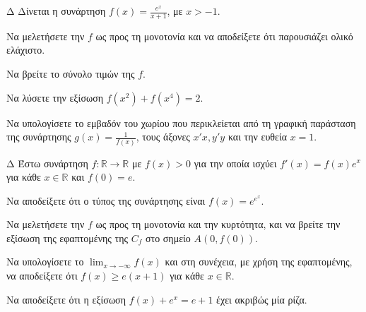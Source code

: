 \begin{thema}{Δ}
Δίνεται η συνάρτηση $\displaystyle f(x) = \frac{e^x}{x+1}$, με $x > -1$.
\begin{erwthma}
    \item Να μελετήσετε την $f$ ως προς τη μονοτονία και να αποδείξετε ότι παρουσιάζει ολικό ελάχιστο.
    \item Να βρείτε το σύνολο τιμών της $f$.
    \item Να λύσετε την εξίσωση $f(x^2) + f(x^4) = 2$.
    \item Να υπολογίσετε το εμβαδόν του χωρίου που περικλείεται από τη γραφική παράσταση της συνάρτησης $\displaystyle g(x) = \frac{1}{f(x)}$, τους άξονες $x'x, y'y$ και την ευθεία $x=1$.
\end{erwthma}
\end{thema}

\begin{thema}{Δ}
Έστω συνάρτηση $f: \mathbb{R} \to \mathbb{R}$ με $f(x)>0$ για την οποία ισχύει $f'(x) = f(x) e^x$ για κάθε $x \in \mathbb{R}$ και $f(0) = e$.
\begin{erwthma}
    \item Να αποδείξετε ότι ο τύπος της συνάρτησης είναι $f(x) = e^{e^x}$.
    \item Να μελετήσετε την $f$ ως προς τη μονοτονία και την κυρτότητα, και να βρείτε την εξίσωση της εφαπτομένης της $C_f$ στο σημείο $A(0, f(0))$.
    \item Να υπολογίσετε το $\displaystyle \lim_{x\to -\infty} f(x)$ και στη συνέχεια, με χρήση της εφαπτομένης, να αποδείξετε ότι $f(x) \ge e(x+1)$ για κάθε $x \in \mathbb{R}$.
    \item Να αποδείξετε ότι η εξίσωση $f(x) + e^x = e + 1$ έχει ακριβώς μία ρίζα.
\end{erwthma}
\end{thema}

